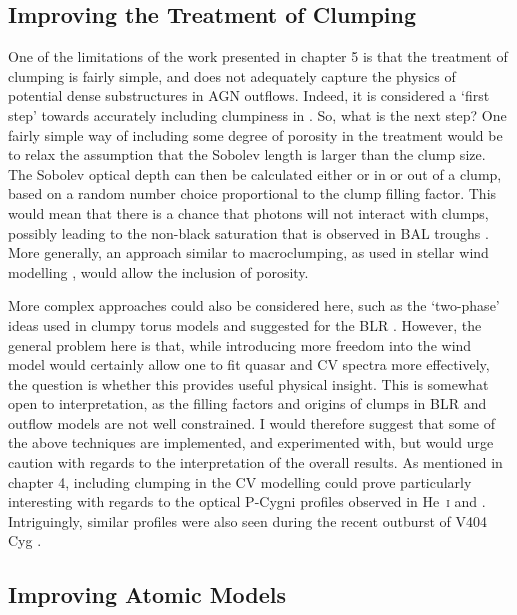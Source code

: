 \subsection{Improving the Treatment of Clumping}

One of the limitations of the work presented in chapter 5 is that the
treatment of clumping is fairly simple, and does not adequately capture the
physics of potential dense substructures in AGN outflows. 
Indeed, it is considered a `first step' towards
accurately including clumpiness in \py. So, what is the next step? One fairly 
simple way of including some degree of porosity in the treatment would 
be to relax the assumption that the Sobolev length is larger than the
clump size. The Sobolev optical depth can then be calculated either
or in or out of a clump, based on a random number choice proportional
to the clump filling factor. This would mean that there is a chance 
that photons will not interact with clumps, possibly leading to
the non-black saturation that is observed in BAL troughs 
\citep[][see also section~\ref{sec:balqso_angles}]{arav1999b,arav1999a}.
More generally, an approach similar to macroclumping, as 
used in stellar wind modelling \citep[e.g.][]{hamann2008,surlan2012},
would allow the inclusion of porosity.

More complex approaches could also be considered here, 
such as the `two-phase' ideas used in clumpy torus models 
\citep{stalevski2013} and suggested for the BLR 
\citep[e.g.][]{netzer1990, dekool1995, elvis2000}.
However, the general problem here is that, while introducing more freedom into 
the wind model would certainly allow one to fit quasar and CV spectra
more effectively, the question is whether this provides useful physical insight.
This is somewhat open to interpretation, as the filling factors and origins of clumps
in BLR and outflow models are not well constrained. I would therefore suggest that
some of the above techniques are implemented, and experimented with,
but would urge caution with regards to the interpretation of the overall
results. As mentioned in chapter 4, including clumping in the CV modelling
could prove particularly interesting with regards to the optical P-Cygni profiles 
observed in He~\textsc{i} and \ha. Intriguingly, similar profiles were also 
seen during the recent outburst of V404 Cyg \citep{munozdarias2016}.

\subsection{Improving Atomic Models}

